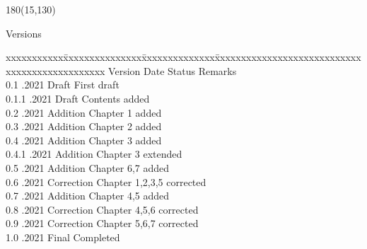 
\begin{textblock}{180}(15,130)
\color{black}
\begin{huge}
Versions
\end{huge}
\vspace{5mm}

\fontsize{10pt}{18pt}\selectfont
\begin{tabbing}
xxxxxxxxxxx\=xxxxxxxxxxxxxxx\=xxxxxxxxxxxxxx\=xxxxxxxxxxxxxxxxxxxxxxxxxxxxxxxxxxxxxxxxxxxxxxx \kill
Version	\> Date	\> Status			\> Remarks		\\
0.1 .2021 \> Draft      \> First draft           \\
0.1.1 .2021 \> Draft      \> Contents added        \\
0.2 .2021 \> Addition   \> Chapter 1 added       \\
0.3 .2021 \> Addition   \> Chapter 2 added       \\
0.4 .2021 \> Addition   \> Chapter 3 added       \\
0.4.1 .2021 \> Addition   \> Chapter 3 extended    \\
0.5 .2021 \> Addition   \> Chapter 6,7 added       \\
0.6 .2021 \> Correction   \> Chapter 1,2,3,5 corrected       \\
0.7 .2021 \> Addition   \> Chapter 4,5 added       \\
0.8 .2021 \> Correction   \> Chapter 4,5,6 corrected       \\
0.9 .2021 \> Correction   \> Chapter 5,6,7 corrected       \\
1.0 .2021 \> Final      \> Completed             \\
\end{tabbing}

\end{textblock}



